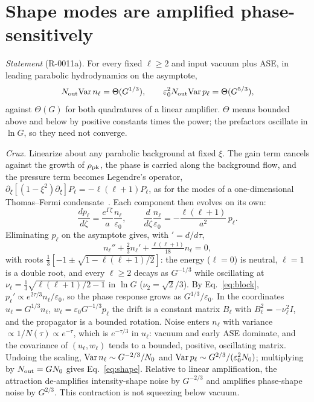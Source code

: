\documentclass[aps,pra,twocolumn,superscriptaddress,nofootinbib,floatfix]{revtex4-2}
\newcommand{\Nout}{N_{\rm out}}
\newcommand{\eps}{\varepsilon_0}
\begin{document}
\section{Shape modes are amplified phase-sensitively}\label{sec:shape}

\textit{Statement} (R-0011a). For every fixed $\ell\ge2$ and input vacuum plus ASE, in leading parabolic hydrodynamics on
the asymptote,
\begin{equation}
\Nout{\rm Var}\,n_\ell=\Theta(G^{1/3}),\qquad \eps^2\Nout{\rm Var}\,p_\ell=\Theta(G^{5/3}),\label{eq:shape}
\end{equation}
against $\Theta(G)$ for both quadratures of a linear amplifier. $\Theta$ means bounded above and below by positive
constants times the power; the prefactors oscillate in $\ln G$, so they need not converge.

\textit{Crux.} Linearize about any parabolic background at fixed $\xi$. The gain term cancels against the growth of
$\rho_{\rm pk}$, the phase is carried along the background flow, and the pressure term becomes Legendre's operator,
$\partial_\xi[(1-\xi^2)\partial_\xi]P_\ell=-\ell(\ell+1)P_\ell$, as for the modes of a one-dimensional Thomas--Fermi
condensate~\cite{menotti2002,fedichev2004}. Each component then evolves on its own:
\begin{equation}
\frac{dp_\ell}{d\zeta}=\frac{e^{\Gamma\zeta}}{a}\frac{n_\ell}{\eps},\qquad
\frac{d}{d\zeta}\frac{n_\ell}{\eps}=-\frac{\ell(\ell+1)}{a^2}\,p_\ell .\label{eq:block}
\end{equation}
Eliminating $p_\ell$ on the asymptote gives, with $'=d/d\tau$,
\begin{equation}
n_\ell''+\tfrac23n_\ell'+\tfrac{\ell(\ell+1)}{18}n_\ell=0,\label{eq:legendre}
\end{equation}
with roots $\frac13[-1\pm\sqrt{1-\ell(\ell+1)/2}]$: the energy ($\ell=0$) is neutral, $\ell=1$ is a double root, and every
$\ell\ge2$ decays as $G^{-1/3}$ while oscillating at $\nu_\ell=\frac13\sqrt{\ell(\ell+1)/2-1}$ in $\ln G$ ($\nu_2=\sqrt2/3$).
By Eq.~\eqref{eq:block}, $p_\ell'\propto e^{2\tau/3}n_\ell/\eps$, so the phase response grows as $G^{1/3}/\eps$. In the
coordinates $u_\ell=G^{1/3}n_\ell$, $w_\ell=\eps G^{-1/3}p_\ell$ the drift is a constant matrix $B_\ell$ with
$B_\ell^2=-\nu_\ell^2I$, and the propagator is a bounded rotation. Noise enters $n_\ell$ with variance
$\propto1/N(\tau)\propto e^{-\tau}$, which is $e^{-\tau/3}$ in $u_\ell$: vacuum and early ASE dominate, and the covariance
of $(u_\ell,w_\ell)$ tends to a bounded, positive, oscillating matrix. Undoing the scaling, ${\rm Var}\,n_\ell\sim G^{-2/3}/N_0$
and ${\rm Var}\,p_\ell\sim G^{2/3}/(\eps^2N_0)$; multiplying by $\Nout=GN_0$ gives Eq.~\eqref{eq:shape}. Relative to linear
amplification, the attraction de-amplifies intensity-shape noise by $G^{-2/3}$ and amplifies phase-shape noise by
$G^{2/3}$. This contraction is not squeezing below vacuum.
\end{document}
